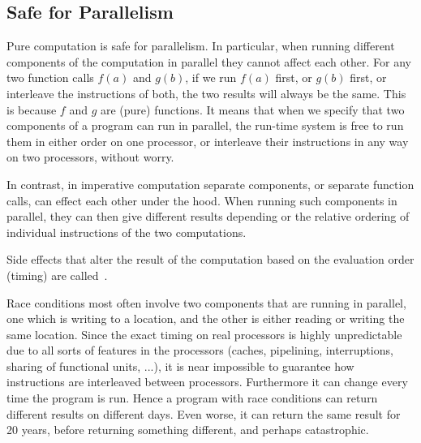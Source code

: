 \subsection{Safe for Parallelism}
\begin{gram}
Pure computation is safe for parallelism.
%
In particular, when running different components of the computation in parallel they
cannot affect each other.  For any two function calls $f(a)$ and
$g(b)$, if we run $f(a)$ first, or $g(b)$ first, or interleave the
instructions of both, the two results will always be the same.  This
is because $f$ and $g$ are (pure) functions.  It means that when we
specify that two components of a program can run in parallel, the
run-time system is free to run them in either order on one processor, or
interleave their instructions in any way on two processors, without
worry.

%
In contrast, in imperative computation separate components, or
separate function calls, can effect each other under the hood.   
When running such components in parallel, they can then give different
results depending or the relative ordering of individual instructions
of
the two computations.     
\end{gram}

\begin{definition}
Side effects that alter the result of the computation based on the
evaluation order (timing) are called~.
%
\end{definition}

\begin{gram}
Race conditions most often involve two components that are running
in parallel, one which is writing to a location, and the other is
either reading or writing the same location.     Since the exact timing on
real processors is highly unpredictable due to all sorts of features
in the processors (caches, pipelining, interruptions, sharing of
functional units, ...),   it is near impossible to guarantee how
instructions are interleaved between processors.     Furthermore it
can change every time the program is run.   Hence a program with race
conditions can return different results on different days.  Even
worse, it can return the same result for 20 years, before returning
something different, and perhaps catastrophic.
\end{gram}

